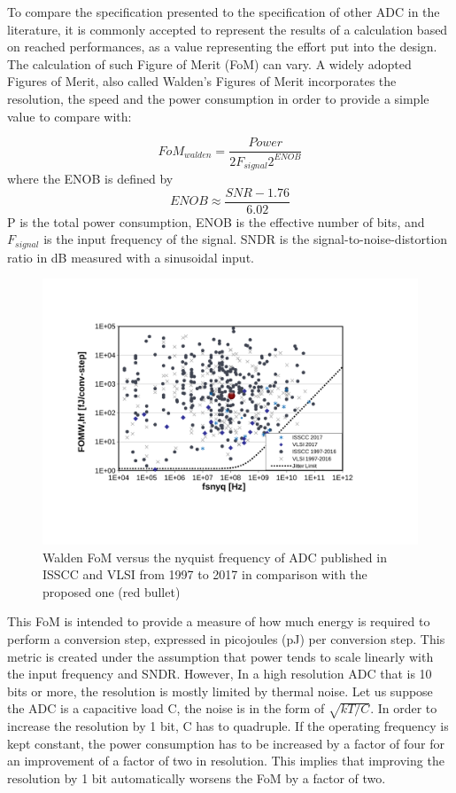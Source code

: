 To compare the specification presented to the specification of other ADC in the literature, it is commonly accepted to represent the results of a calculation based on reached performances, as a value representing the effort put into the design. The calculation of such Figure of Merit (FoM) can vary. A widely adopted Figures of Merit, also called Walden’s Figures of Merit incorporates the resolution, the speed and the power consumption in order to provide a simple value to compare with:

\begin{equation}
FoM_{walden} = \frac{Power}{2 F_{signal} 2^{ENOB}}
\end{equation}
where the ENOB is defined by 
\begin{equation}
ENOB \approx \frac{SNR -1.76}{6.02}
\end{equation}
P is the total power consumption, ENOB is the effective number of bits, and \(F_{signal}\) is the input frequency of the signal. SNDR is the signal-to-noise-distortion ratio in dB measured with a sinusoidal input. 

\begin{figure}[htp]
    \centering
    \includegraphics[trim={2.5cm 3.5cm 3.5cm 3.5cm},clip,width=.8\textwidth]{Chapter1/Figs/walden-fom.pdf}
    \caption{Walden FoM versus the nyquist frequency of ADC published in ISSCC and VLSI from 1997 to 2017 in comparison with the proposed one (red bullet)}
    \label{fig:walden-fom-comparison}
\end{figure}

This FoM is intended to provide a measure of how much energy is required to perform a conversion step, expressed in picojoules (pJ) per conversion step. This metric is created under the assumption that power tends to scale linearly with the input frequency and SNDR. However, In a high resolution ADC that is 10 bits or more, the resolution is mostly limited by thermal noise. Let us suppose the ADC is a capacitive load C, the noise is in the form of \(\sqrt{kT/C}\). In order to increase the resolution by 1 bit, C has to quadruple. If the operating frequency is kept constant, the power consumption has to be increased by a factor of four for an improvement of a factor of two in resolution. This implies that improving the resolution by 1 bit automatically worsens the FoM by a factor of two.

